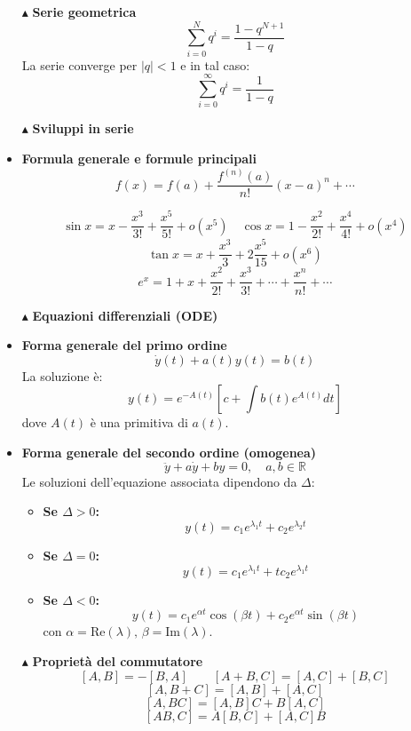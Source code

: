 \documentclass{book}
\newcommand{\g}{\textbf}
\newcommand{\e}{\begin{equation}}
\newcommand{\ex}{\end{equation} }
\renewcommand{\it}{\item[$\cdot$]}
\begin{document}
\begin{multicols}{4}
\begin{itemize}
    \item [$\blacktriangle$] \g{Serie geometrica}
        \e{\sum_{i=0}^N q^i = \frac{1 - q^{N+1}}{1 - q}} \ex
        La serie converge per $|q| < 1$ e in tal caso:
        \e{\sum_{i=0}^\infty q^i = \frac{1}{1 - q}} \ex
\item [$\blacktriangle$] \g{Sviluppi in serie}
\it \g{Formula generale e formule principali}
\e{f(x) = f(a) + \frac{f^{(n)}(a)}{n!}(x - a)^n + \cdots}\ex
   
        \e{\sin x = x - \frac{x^3}{3!} + \frac{x^5}{5!} + o(x^5) \quad \cos x = 1 - \frac{x^2}{2!} + \frac{x^4}{4!} + o(x^4)} \ex
        \e{\tan x = x + \frac{x^3}{3} + 2\frac{x^5}{15} + o(x^6)} \ex
        \e{e^x = 1 + x + \frac{x^2}{2!} + \frac{x^3}{3!} + \cdots + \frac{x^n}{n!} + \cdots}\ex
\item [$\blacktriangle$] \g{Equazioni differenziali (ODE)}
    \it \g{Forma generale del primo ordine}
        \e{\dot{y}(t) + a(t)y(t) = b(t)} \ex
        La soluzione è:
        \e{y(t) = e^{-A(t)}\left[c + \int b(t)e^{A(t)}dt\right]} \ex
        dove $A(t)$ è una primitiva di $a(t)$.

    \it \g{Forma generale del secondo ordine (omogenea)}
        \e{\ddot{y} + a\dot{y} + by = 0, \quad a, b \in \mathbb{R}} \ex
        Le soluzioni dell'equazione associata dipendono da $\Delta$:
        \begin{itemize}
            \it \g{Se $\Delta > 0$:}
                \e{y(t) = c_1 e^{\lambda_1 t} + c_2 e^{\lambda_2 t}} \ex
            \it \g{Se $\Delta = 0$:}
                \e{y(t) = c_1 e^{\lambda_1 t} + t c_2 e^{\lambda_1 t}} \ex
            \it \g{Se $\Delta < 0$:}
                \e{y(t) = c_1 e^{\alpha t}\cos(\beta t) + c_2 e^{\alpha t}\sin(\beta t)} \ex
                con $\alpha = \text{Re}(\lambda), \, \beta = \text{Im}(\lambda)$.
        \end{itemize}
\item [$\blacktriangle$] \g{Proprietà del commutatore}
    \e{[A, B] = -[B, A] \qquad [A + B, C] = [A, C] + [B, C]} \ex
    \e{[A, B + C] = [A, B] + [A, C]}\ex
    \e{[A, BC] = [A, B]C + B[A, C] }\ex 
    \e{[AB, C] = A[B, C] + [A, C]B} \ex


\end{itemize}

\end{multicols}
\end{document}
